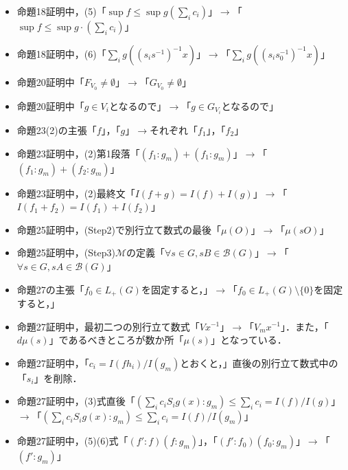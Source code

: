\documentclass[b5paper,dvipdfmx]{jsarticle}
\begin{document}
\begin{itemize}
\item 命題18証明中，(5)「$\sup f \le \sup g ( \sum_{i}c_{i} )$」$\rightarrow$「$\sup f \le \sup g \cdot ( \sum_{i}c_{i} )$」
\item 命題18証明中，(6)「$\sum_{i} g( (s_{i} s^{-1}) ^{-1}x)$」$\rightarrow$「$\sum_{i} g( (s_{i} s_{0}^{-1}) ^{-1}x)$」
\item 命題20証明中「$F_{V_0} \neq \emptyset$」$\rightarrow$「$G_{V_0} \neq \emptyset$」
\item 命題20証明中「$g \in V_i$となるので」$\rightarrow$「$g \in G_{V_i}$となるので」
\item 命題23(2)の主張「$f$」，「$g$」$\rightarrow$それぞれ「$f_1$」，「$f_2$」
\item 命題23証明中，(2)第1段落「$(f_1 : g_m )+(f_1 : g_m)$」$\rightarrow$「$(f_1 : g_m )+(f_2 : g_m)$」 
\item 命題23証明中，(2)最終文「$I(f+g)=I(f)+I(g)$」$\rightarrow$「$I(f_1+f_2)=I(f_1)+I(f_2)$」
\item 命題25証明中，(Step2)で別行立て数式の最後「$\mu(O)$」$\rightarrow$「$\mu(sO)$」
\item 命題25証明中，(Step3)$\mathscr{M}$の定義「$\forall s \in G , sB \in \mathscr{B}(G)$」$\rightarrow$「$\forall s \in G , sA \in \mathscr{B}(G)$」
\item 命題27の主張「$f_0 \in L_{+}(G)$を固定すると，」$\rightarrow$「$f_0 \in L_{+}(G) \setminus \{ 0 \}$を固定すると，」
\item 命題27証明中，最初二つの別行立て数式「$Vx^{-1}$」$\rightarrow$「$V_{m}x^{-1}$」．また，「$d\mu (s)$」であるべきところが数か所「$\mu (s)$」となっている．
\item 命題27証明中，「$c_i=I(fh_i)/I(g_{m})$とおくと，」直後の別行立て数式中の「$s_i$」を削除．
\item 命題27証明中，(3)式直後「$\left( \sum_{i}c_{i}S_{i}g(x) : g_{m} \right) \le \sum_{i}c_{i}=I(f)/I(g)$」$\rightarrow$「$\left( \sum_{i}c_{i}S_{i}g(x) : g_{m} \right) \le \sum_{i}c_{i}=I(f)/I(g_{m})$」
\item 命題27証明中，(5)(6)式「$\left( f' : f \right) \left( f : g_{m} \right)$」，「$\left( f' : f_0 \right) \left( f_0 : g_{m} \right)$」$\rightarrow$「$\left( f' : g_{m} \right)$」
\end{itemize}
\end{document}
